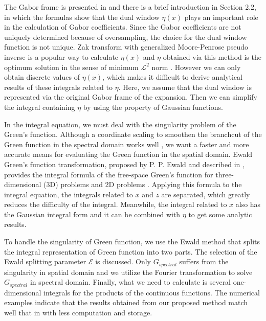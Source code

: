 \documentclass[preprint,12pt]{elsarticle}
\begin{document}
The Gabor frame is {presented} in \cite{Feichtinger1998Gabor} and there is a brief introduction in Section 2.2, in which the formulas show that the dual window $\eta(x)$ plays an important role in the calculation of Gabor coefficients. Since the Gabor coefficients are not uniquely determined because of oversampling, the choice for the dual window function is not unique. Zak transform with generalized Moore-Penrose pseudo inverse is {a} popular way to calculate $\eta(x)$ \cite{Bastiaans1995Gabor, Werther2005Dual} and $\eta$ obtained via this method  is the optimum solution in the sense of minimum $\mathcal{L}^2$ norm \cite{Feichtinger1998Gabor, Janssen1994Signal}. However we can only obtain discrete values of $\eta(x)$, which makes it difficult to derive analytical results of these integrals related to $\eta$.  Here, we assume that 
{the dual window is represented via the original Gabor frame of the expansion.} Then we can simplify the integral containing $\eta$ by using the property of Gaussian functions.

In the integral equation, we must deal with the singularity problem of {the} Green's function.  Although a coordinate scaling to smoothen the branchcut of the Green function in the spectral domain works well \cite{Dilz2016The}, we want {a} faster and more accurate means for evaluating the Green function in the spatial domain. Ewald Green's function transformation, proposed by P. P. Ewald and described in \cite{Ewald1921Die, Ewald1970On},  provides the integral formula of the {free-space} Green's function for {three-dimensional} (3D) problems \cite{Jordan1986An} and 2D problems \cite{Mathis1996A}. Applying this formula to the integral equation, the integrals related to $x$ and $z$ are separated, which greatly reduces the difficulty of the integral. Meanwhile, the integral related to $x$ also has the Gaussian integral form and it can be combined with $\eta$ to get some analytic results. 

To {handle} the singularity of Green function, we use the Ewald method \cite{Capolino2005Efficient, Capolino2007Efficient,  Komanduri20161} that splits the integral {representation} of Green function into two parts. The selection of the Ewald splitting parameter $\mathcal{E}$ {is} discussed. %
Only $G_{spectral}$ suffers from the singularity in spatial domain and we utilize the Fourier {transformation} to solve $G_{spectral}$ in spectral domain. Finally, what we need to calculate is several {one-dimensional} integrals for the products of the continuous functions. The numerical examples indicate that the results obtained from our proposed method match well that in \cite{Dilz2016The} with less computation and storage.
\end{document}
